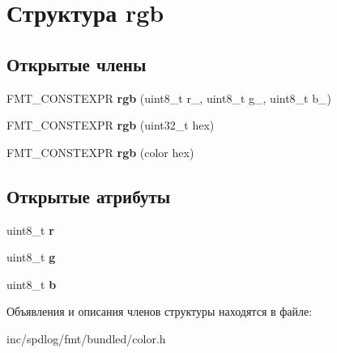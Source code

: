 \hypertarget{structrgb}{}\section{Структура rgb}
\label{structrgb}
\subsection*{Открытые члены}
\begin{DoxyCompactItemize}
\item 
\mbox{\label{structrgb_a4e50eebe5398980d400786152794c1c1}} 
F\+M\+T\+\_\+\+C\+O\+N\+S\+T\+E\+X\+PR {\bfseries rgb} (uint8\+\_\+t r\+\_\+, uint8\+\_\+t g\+\_\+, uint8\+\_\+t b\+\_\+)
\item 
\mbox{\label{structrgb_a0608250c02d5a66aa54f5c8d6fe44796}} 
F\+M\+T\+\_\+\+C\+O\+N\+S\+T\+E\+X\+PR {\bfseries rgb} (uint32\+\_\+t hex)
\item 
\mbox{\label{structrgb_a59530c7b82ac138e28d921b44e77656e}} 
F\+M\+T\+\_\+\+C\+O\+N\+S\+T\+E\+X\+PR {\bfseries rgb} (color hex)
\end{DoxyCompactItemize}
\subsection*{Открытые атрибуты}
\begin{DoxyCompactItemize}
\item 
\mbox{\label{structrgb_afd9a3feaf22de2f96ba25d19494235a6}} 
uint8\+\_\+t {\bfseries r}
\item 
\mbox{\label{structrgb_a644713f43fbcf5e9f070fa1843aee55f}} 
uint8\+\_\+t {\bfseries g}
\item 
\mbox{\label{structrgb_a5ff4e0f515919a82c3f401afa8555da4}} 
uint8\+\_\+t {\bfseries b}
\end{DoxyCompactItemize}


Объявления и описания членов структуры находятся в файле\+:\begin{DoxyCompactItemize}
\item 
inc/spdlog/fmt/bundled/color.\+h\end{DoxyCompactItemize}
